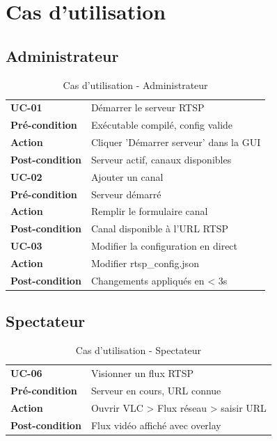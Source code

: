 \documentclass[12pt,a4paper]{report}
\begin{document}
\section{Cas d'utilisation}

\subsection{Administrateur}

\begin{table}[H]
    \centering
    \caption{Cas d'utilisation - Administrateur}
    \label{tab:uc_admin}
    \begin{tabular}{|l|l|}
        \hline
        \textbf{UC-01} & Démarrer le serveur RTSP \\
        \textbf{Pré-condition} & Exécutable compilé, config valide \\
        \textbf{Action} & Cliquer 'Démarrer serveur' dans la GUI \\
        \textbf{Post-condition} & Serveur actif, canaux disponibles \\
        \hline
        \textbf{UC-02} & Ajouter un canal \\
        \textbf{Pré-condition} & Serveur démarré \\
        \textbf{Action} & Remplir le formulaire canal \\
        \textbf{Post-condition} & Canal disponible à l'URL RTSP \\
        \hline
        \textbf{UC-03} & Modifier la configuration en direct \\
        \textbf{Action} & Modifier rtsp\_config.json \\
        \textbf{Post-condition} & Changements appliqués en < 3s \\
        \hline
    \end{tabular}
\end{table}

\subsection{Spectateur}

\begin{table}[H]
    \centering
    \caption{Cas d'utilisation - Spectateur}
    \label{tab:uc_spectateur}
    \begin{tabular}{|l|l|}
        \hline
        \textbf{UC-06} & Visionner un flux RTSP \\
        \textbf{Pré-condition} & Serveur en cours, URL connue \\
        \textbf{Action} & Ouvrir VLC > Flux réseau > saisir URL \\
        \textbf{Post-condition} & Flux vidéo affiché avec overlay \\
        \hline
    \end{tabular}
\end{table}
\end{document}
